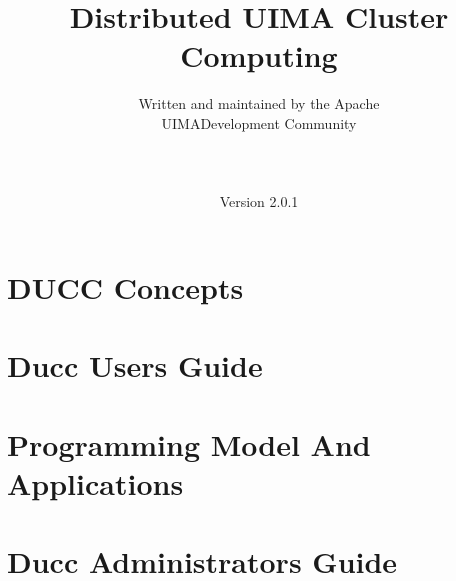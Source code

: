 \documentclass[oneside]{book}
\title{\Huge \textbf{Distributed UIMA Cluster Computing}}
\author{Written and maintained by the Apache\\
UIMA\texttrademark Development Community \\
\\
\\
\\
Version 2.0.1}
\date{}
\begin{document}
\frontmatter
\maketitle



\renewcommand\contentsname{Table of Contents}
\tableofcontents
\listoffigures

\mainmatter



\part{DUCC Concepts}



\part{Ducc Users Guide}


\part{Programming Model And Applications}


\part{Ducc Administrators Guide}


% 
\end{document}
